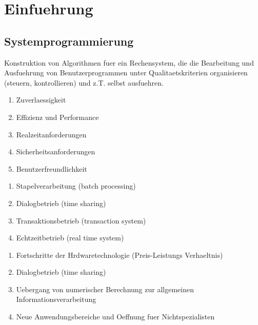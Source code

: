 \chapter{Einfuehrung}

\section{Systemprogrammierung}

Konstruktion von Algorithmen fuer ein Rechensystem, die die Bearbeitung und Ausfuehrung von Benutzerprogrammen unter Qualitaetskriterien organisieren (steuern, kontrollieren) und z.T. selbst ausfuehren.

\begin{enumerate}
	\item Zuverlaessigkeit
	\item Effizienz und Performance
	\item Realzeitanforderungen
	\item Sicherheitsanforderungen
	\item Benutzerfreundlichkeit
\end{enumerate}

\begin{enumerate}
	\item Stapelverarbeitung (batch processing)
	\item Dialogbetrieb (time sharing)
	\item Transaktionsbetrieb (transaction system)
	\item Echtzeitbetrieb (real time system)
\end{enumerate}

\begin{enumerate}
	\item Fortschritte der Hrdwaretechnologie (Preis-Leistungs Verhaeltnis)
	\item Dialogbetrieb (time sharing)
	\item Uebergang von numerischer Berechnung zur allgemeinen Informationsverarbeitung
	\item Neue Anwendungsbereiche und Oeffnung fuer Nichtspezialisten 
\end{enumerate}
